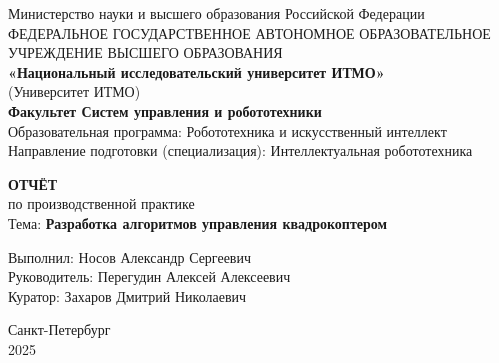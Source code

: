 \thispagestyle{empty}
\begin{center}
Министерство науки и высшего образования Российской Федерации\\
ФЕДЕРАЛЬНОЕ ГОСУДАРСТВЕННОЕ АВТОНОМНОЕ ОБРАЗОВАТЕЛЬНОЕ УЧРЕЖДЕНИЕ ВЫСШЕГО ОБРАЗОВАНИЯ\\
\textbf{«Национальный исследовательский университет ИТМО»}\\
(Университет ИТМО)\\
\vspace{1cm}
\textbf{Факультет Систем управления и робототехники}\\
Образовательная программа: Робототехника и искусственный интеллект\\
Направление подготовки (специализация): Интеллектуальная робототехника\\

\end{center}

\vspace{2cm}
\begin{center}
\textbf{ОТЧЁТ}\\
по производственной практике\\
Тема: \textbf{Разработка алгоритмов управления квадрокоптером}
\end{center}

\vspace{3cm}
\begin{flushright}
Выполнил: Носов Александр Сергеевич\\
Руководитель: Перегудин Алексей Алексеевич\\
Куратор: Захаров Дмитрий Николаевич
\end{flushright}

\vspace{5cm}
\begin{center}
Санкт-Петербург\\
2025
\end{center}

\endinput
